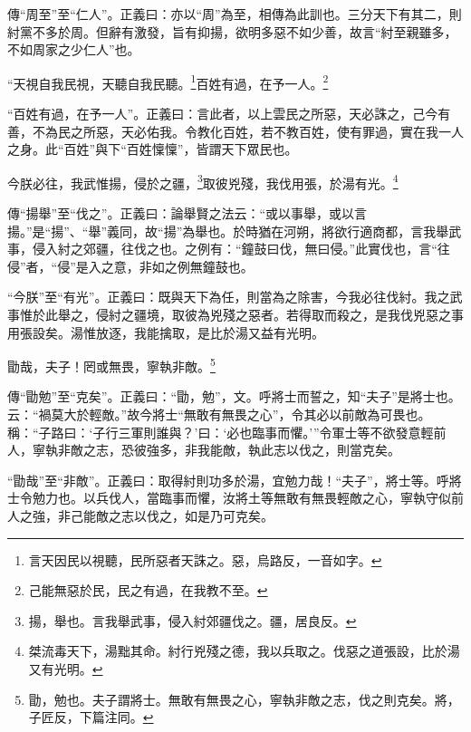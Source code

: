 {\noindent\zhuan{}\fzbyks 傳“周至”至“仁人”。正義曰：亦以“周”為至，相傳為此訓也。三分天下有其二，則紂黨不多於周。但辭有激發，旨有抑揚，欲明多惡不如少善，故言“紂至親雖多，不如周家之少仁人”也。 \par}

“天視自我民視，天聽自我民聽。\footnote{言天因民以視聽，民所惡者天誅之。惡，烏路反，一音如字。}百姓有過，在予一人。\footnote{己能無惡於民，民之有過，在我教不至。}

{\noindent\shu{}\fzkt “百姓有過，在予一人”。正義曰：言此者，以上雲民之所惡，天必誅之，己今有善，不為民之所惡，天必佑我。令教化百姓，若不教百姓，使有罪過，實在我一人之身。此“百姓”與下“百姓懍懍”，皆謂天下眾民也。 \par}

今朕必往，我武惟揚，侵於之疆，\footnote{揚，舉也。言我舉武事，侵入紂郊疆伐之。疆，居良反。}取彼兇殘，我伐用張，於湯有光。\footnote{桀流毒天下，湯黜其命。紂行兇殘之德，我以兵取之。伐惡之道張設，比於湯又有光明。}

{\noindent\zhuan{}\fzbyks 傳“揚舉”至“伐之”。正義曰：論舉賢之法云：“或以事舉，或以言揚。”是“揚”、“舉”義同，故“揚”為舉也。於時猶在河朔，將欲行適商都，言我舉武事，侵入紂之郊疆，往伐之也。之例有：“鐘鼓曰伐，無曰侵。”此實伐也，言“往侵”者，“侵”是入之意，非如之例無鐘鼓也。 \par}

{\noindent\shu{}\fzkt “今朕”至“有光”。正義曰：既與天下為任，則當為之除害，今我必往伐紂。我之武事惟於此舉之，侵紂之疆境，取彼為兇殘之惡者。若得取而殺之，是我伐兇惡之事用張設矣。湯惟放逐，我能擒取，是比於湯又益有光明。 \par}

勖哉，夫子！罔或無畏，寧執非敵。\footnote{勖，勉也。夫子謂將士。無敢有無畏之心，寧執非敵之志，伐之則克矣。將，子匠反，下篇注同。}

{\noindent\zhuan{}\fzbyks 傳“勖勉”至“克矣”。正義曰：“勖，勉”，文。呼將士而誓之，知“夫子”是將士也。云：“禍莫大於輕敵。”故今將士“無敢有無畏之心”，令其必以前敵為可畏也。稱：“子路曰：‘子行三軍則誰與？’曰：‘必也臨事而懼。’”令軍士等不欲發意輕前人，寧執非敵之志，恐彼強多，非我能敵，執此志以伐之，則當克矣。 \par}

{\noindent\shu{}\fzkt “勖哉”至“非敵”。正義曰：取得紂則功多於湯，宜勉力哉！“夫子”，將士等。呼將士令勉力也。以兵伐人，當臨事而懼，汝將土等無敢有無畏輕敵之心，寧執守似前人之強，非己能敵之志以伐之，如是乃可克矣。 \par}

